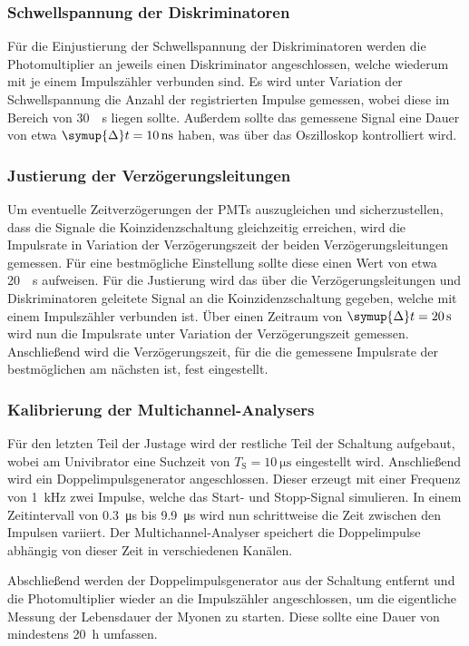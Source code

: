 \subsubsection{Schwellspannung der Diskriminatoren}

Für die Einjustierung der Schwellspannung der Diskriminatoren werden die Photomultiplier an jeweils einen Diskriminator angeschlossen,
welche wiederum mit je einem Impulszähler verbunden sind.
Es wird unter Variation der Schwellspannung die Anzahl der registrierten Impulse gemessen,
wobei diese im Bereich von \SI[per-mode=reciprocal]{30}{\per\second} liegen sollte.
Außerdem sollte das gemessene Signal eine Dauer von etwa $\symup{\Delta}t = \SI{10}{\nano\second}$ haben,
was über das Oszilloskop kontrolliert wird.


\subsubsection{Justierung der Verzögerungsleitungen}

Um eventuelle Zeitverzögerungen der \acp{PMT} auszugleichen und sicherzustellen,
dass die Signale die Koinzidenzschaltung gleichzeitig erreichen,
wird die Impulsrate in Variation der Verzögerungszeit der beiden Verzögerungsleitungen gemessen.
Für eine bestmögliche Einstellung sollte diese einen Wert von etwa \SI[per-mode=reciprocal]{20}{\per\second} aufweisen.
Für die Justierung wird das über die Verzögerungsleitungen und Diskriminatoren geleitete Signal an die Koinzidenzschaltung gegeben,
welche mit einem Impulszähler verbunden ist.
Über einen Zeitraum von $\symup{\Delta}t = \SI{20}{\second}$ wird nun die Impulsrate unter Variation der Verzögerungszeit gemessen.
Anschließend wird die Verzögerungszeit,
für die die gemessene Impulsrate der bestmöglichen am nächsten ist,
fest eingestellt.


\subsubsection{Kalibrierung der Multichannel-Analysers}

Für den letzten Teil der Justage wird der restliche Teil der Schaltung aufgebaut,
wobei am Univibrator eine Suchzeit von $T_\text{S} = \SI{10}{\micro\second}$ eingestellt wird.
Anschließend wird ein Doppelimpulsgenerator angeschlossen.
Dieser erzeugt mit einer Frequenz von \SI{1}{\kilo\hertz} zwei Impulse,
welche das Start- und Stopp-Signal simulieren.
In einem Zeitintervall von \SI{0.3}{\micro\second} bis \SI{9.9}{\micro\second} wird nun schrittweise die Zeit zwischen den Impulsen variiert.
Der Multichannel-Analyser speichert die Doppelimpulse abhängig von dieser Zeit in verschiedenen Kanälen.

Abschließend werden der Doppelimpulsgenerator aus der Schaltung entfernt und die Photomultiplier wieder an die Impulszähler angeschlossen,
um die eigentliche Messung der Lebensdauer der Myonen zu starten.
Diese sollte eine Dauer von mindestens \SI{20}{\hour} umfassen.
